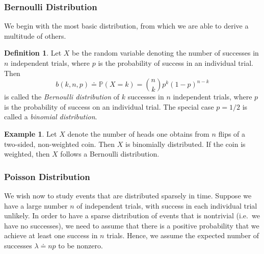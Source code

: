 \documentclass[12pt]{article}
\theoremstyle{plain}
\theoremstyle{definition}
\newtheorem*{definition}{Definition}
\newtheorem*{example}{Example}
\theoremstyle{remark}
\numberwithin{equation}{section}  %
\begin{document}
\subsubsection{Bernoulli Distribution}
We begin with the most basic distribution, from which
we are able to derive a multitude of others.
\begin{definition}
    Let $X$ be the random variable denoting the number of successes
    in $n$ independent trials, where $p$ is the probability of success in
    an individual trial. Then
    \begin{equation*}
        b(k, n, p) \doteq \mathbb{P}(X = k) = \binom{n}{k} p^k {(1 - p)}^{n-k}
    \end{equation*}
    is called the \emph{Bernoulli distribution} of $k$ successes
    in $n$ independent trials, where $p$ is the probability of success on an
    individual trial. The special case
    $p = 1/2$ is called a \emph{binomial distribution}.
\end{definition}
\begin{example}
    Let $X$ denote the number of heads one obtains from $n$ flips of a
    two-sided, non-weighted coin. Then $X$ is binomially distributed.
    If the coin is weighted, then $X$ follows a Bernoulli distribution.
\end{example}
\subsubsection{Poisson Distribution}
We wish now to study events that are distributed sparsely in time.
Suppose we have a large number $n$ of independent trials, with
success in each individual trial unlikely. In order to have a sparse
distribution of events that is nontrivial (i.e.\ we have no successes),
we need to assume that there is a positive
probability that we achieve at least one success in $n$ trials. Hence, we assume the expected number of
successes $\lambda \doteq np$ to be nonzero.
\end{document}
